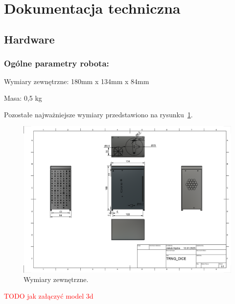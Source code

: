\section{Dokumentacja techniczna}\label{sec:dokumentacja-techniczna}

\subsection{Hardware}
\label{subsec:hardware}
\subsubsection{Ogólne parametry robota:}
Wymiary zewnętrzne: 180mm x  134mm x 84mm

Masa: 0,5 kg

Pozostałe najważniejsze wymiary przedstawiono na rysunku~\ref{fig:wymiary}.
\begin{figure}[H]
    \centering
    \includegraphics[width=0.95\linewidth]{chapters/03-praca-wlasna/figures/wymiary}
    \caption{\label{fig:wymiary}Wymiary zewnętrzne.}
\end{figure}
\textcolor{red}{TODO jak załączyć model 3d}

